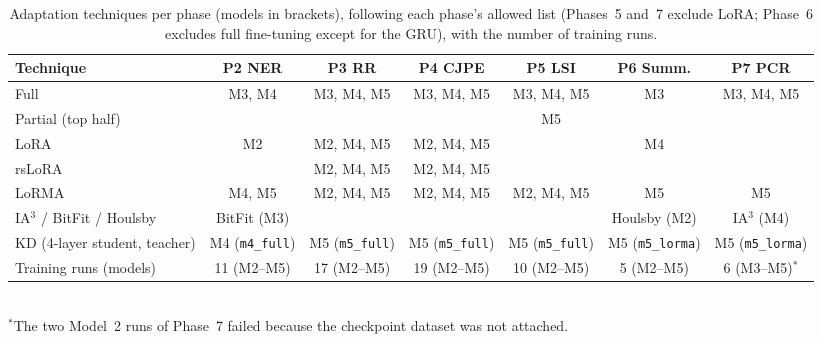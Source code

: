\documentclass[11pt, oneside]{article}
\newcommand{\run}[1]{\texttt{#1}}
\begin{document}
\begin{table}[htbp]
\centering\scriptsize
\caption{Adaptation techniques per phase (models in brackets), following each phase's allowed list (Phases~5 and~7
exclude LoRA; Phase~6 excludes full fine-tuning except for the GRU), with the number of training runs.}
\label{tab:techs}
\begin{adjustbox}{max width=\textwidth}
\begin{tabular}{lcccccc}
\toprule
Technique & P2 NER & P3 RR & P4 CJPE & P5 LSI & P6 Summ. & P7 PCR\\
\midrule
Full & M3, M4 & M3, M4, M5 & M3, M4, M5 & M3, M4, M5 & M3 & M3, M4, M5\\
Partial (top half) & & & & M5 & & \\
LoRA & M2 & M2, M4, M5 & M2, M4, M5 & & M4 & \\
rsLoRA & & M2, M4, M5 & M2, M4, M5 & & & \\
LoRMA & M4, M5 & M2, M4, M5 & M2, M4, M5 & M2, M4, M5 & M5 & M5\\
IA$^3$ / BitFit / Houlsby & BitFit (M3) & & & & Houlsby (M2) & IA$^3$ (M4)\\
KD (4-layer student, teacher) & M4 (\run{m4\_full}) & M5 (\run{m5\_full}) & M5 (\run{m5\_full}) & M5 (\run{m5\_full}) & M5 (\run{m5\_lorma}) & M5 (\run{m5\_lorma})\\
\midrule
Training runs (models) & 11 (M2--M5) & 17 (M2--M5) & 19 (M2--M5) & 10 (M2--M5) & 5 (M2--M5) & 6 (M3--M5)$^*$\\
\bottomrule
\end{tabular}
\end{adjustbox}
\\[1pt]{\footnotesize $^*$The two Model~2 runs of Phase~7 failed because the checkpoint dataset was not attached.}
\end{table}
\end{document}
